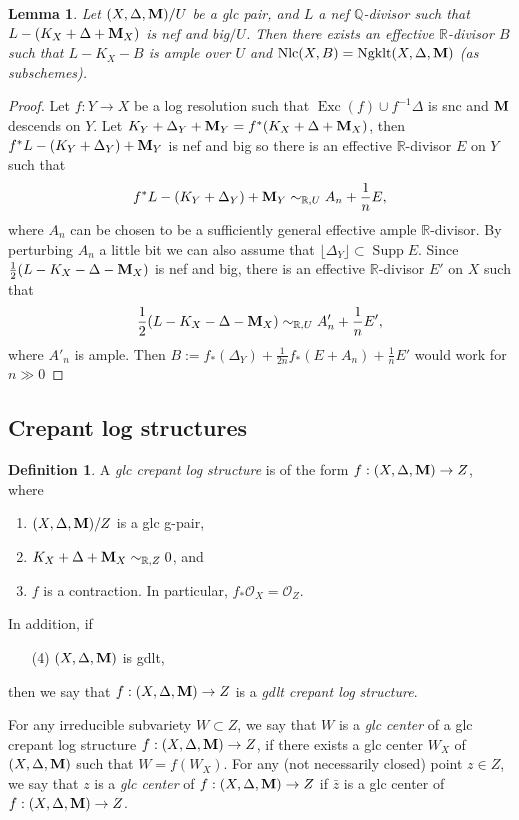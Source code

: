 \documentclass[11pt]{amsart}
\numberwithin{equation}{section}
\newcommand{\Mm}{{\bf{M}}}
\newcommand{\Qq}{\mathbb{Q}}
\newcommand{\Rr}{\mathbb{R}}
\newcommand{\Exc}{\operatorname{Exc}}
\newcommand{\Supp}{\operatorname{Supp}}
\newcommand{\Ngklt}{\operatorname{Ngklt}}
\newcommand{\Nlc}{\operatorname{Nlc}}
\newcommand{\lf}{\lfloor}
\newcommand{\rf}{\rfloor}
\newcommand{\Oo}{\mathcal{O}}
\newtheorem{lem}[thm]{Lemma}
\theoremstyle{definition}
\newtheorem{defn}[thm]{Definition}
\theoremstyle{definition}
\theoremstyle{definition}
\begin{document}
\begin{lem}\label{lem: perturb glc pair to nlc pair}
Let $(X,\Delta,\Mm)/U$ be a glc pair, and $L$ a nef $\Qq$-divisor such that $L-(K_X+\Delta+\Mm_X)$ is nef and big$/U$. Then there exists an effective $\Rr$-divisor $B$ such that $L-K_X-B$ is ample over $U$ and $\Nlc(X,B)=\Ngklt(X,\Delta,\Mm)$ (as subschemes). 
\end{lem}
\begin{proof}
Let $f:Y\to X$ be a log resolution such that $\Exc(f)\cup f^{-1}\Delta$ is snc and $\Mm$ descends on $Y$. Let $K_Y+\Delta_Y+\Mm_Y=f^*(K_X+\Delta+\Mm_X)$, then $f^*L-(K_Y+\Delta_Y)+\Mm_Y$ is nef and big so there is an effective $\Rr$-divisor $E$ on $Y$ such that 
$$
f^*L-(K_Y+\Delta_Y)+\Mm_Y\sim_{\Rr,U} A_n+\frac{1}{n}E,
$$
where $A_n$ can be chosen to be a sufficiently general effective ample $\Rr$-divisor. By perturbing $A_n$ a little bit we can also assume that $\lf\Delta_Y\rf\subset\Supp E$. Since $\frac{1}{2}(L-K_X-\Delta-\Mm_X)$ is nef and big, there is an effective $\Rr$-divisor $E'$ on $X$ such that 
$$
\frac{1}{2}(L-K_X-\Delta-\Mm_X)\sim_{\Rr,U} A'_n+\frac{1}{n}E',
$$
where $A'_n$ is ample. Then $B:=f_*(\Delta_Y)+\frac{1}{2n}f_*(E+A_n)+\frac{1}{n}E'$ would work for $n\gg0$
\end{proof}






\subsection{Crepant log structures}

\begin{defn}\label{defn: glc crepant log structure}
A \emph{glc crepant log structure} is of the form $f: (X,\Delta,\Mm)\rightarrow Z$, where
\begin{enumerate}
    \item $(X,\Delta,\Mm)/Z$ is a glc g-pair,
    \item $K_X+\Delta+\Mm_X\sim_{\Rr,Z}0$, and
    \item $f$ is a contraction. In particular, $f_*\Oo_X=\Oo_Z$.
\end{enumerate}
In addition, if
\begin{enumerate}
    \item[(4)] $(X,\Delta,\Mm)$ is gdlt, 
\end{enumerate}
then we say that $f: (X,\Delta,\Mm)\rightarrow Z$ is a \emph{gdlt crepant log structure}.

For any irreducible subvariety $W\subset Z$, we say that $W$ is a \emph{glc center} of a glc crepant log structure $f: (X,\Delta,\Mm)\rightarrow Z$, if there exists a glc center $W_X$ of $(X,\Delta,\Mm)$ such that $W=f(W_X)$. For any (not necessarily closed) point $z\in Z$, we say that $z$ is a \emph{glc center} of $f: (X,\Delta,\Mm)\rightarrow Z$ if $\bar z$ is a glc center of $f: (X,\Delta,\Mm)\rightarrow Z$.
\end{defn}
\end{document}
